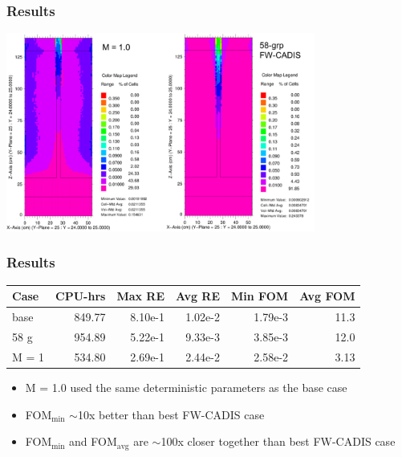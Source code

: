 \documentclass[xcolor=x11names,compress]{beamer}
\renewcommand{\(}{\begin{columns}}
\renewcommand{\)}{\end{columns}}
\newcommand{\<}[1]{\begin{column}{#1}}
\renewcommand{\>}{\end{column}}
\begin{document}
\begin{frame}[fragile]
  \frametitle{Results}
    \begin{center}
  \includegraphics[width=4in,clip]{m1-vs-58g}  
  \end{center}
\end{frame}

\begin{frame}[fragile]
  \frametitle{Results}

	\begin{table}[p]
 	 \label{tab:comparison}
  	\begin{center}
    \begin{tabular}{|l|r|r|r|r|r|}\hline
      Case & CPU-hrs & Max RE & Avg RE & Min FOM & Avg FOM\\\hline
base & 849.77 & 8.10e-1 & 1.02e-2 & 1.79e-3 & 11.3\\
%
58 g & 954.89 & 5.22e-1 & 9.33e-3 & 3.85e-3 & 12.0\\
%
M = 1 & 534.80 & 2.69e-1 & 2.44e-2 & 2.58e-2 & 3.13\\\hline
    \end{tabular}
 	 \end{center}
	\end{table}

	\begin{itemize}
	\item M = 1.0 used the same deterministic parameters as the base case
	\item FOM$_{\min}$ $\sim$10x better than best FW-CADIS case
	\item FOM$_{\min}$ and FOM$_{\text{avg}}$ are $\sim$100x closer together than best FW-CADIS case
	\end{itemize}

\end{frame}
%
%
\end{document}
